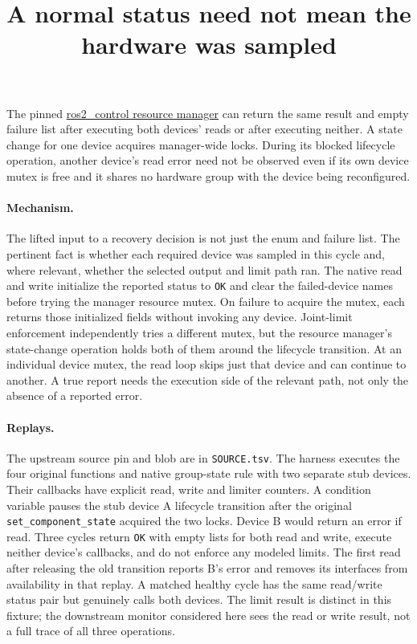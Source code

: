 \documentclass{article}
\title{A normal status need not mean the hardware was sampled}
\begin{document}
\maketitle

The pinned \href{https://github.com/ros-controls/ros2_control/blob/0c94b008a82731967ba89e2e7379ec6d2f07580b/hardware_interface/src/resource_manager.cpp}{ros2\_control resource manager}
can return the same result and empty failure list after executing
both devices' reads or after executing neither. A state change for one
device acquires manager-wide locks. During its blocked lifecycle
operation, another device's read error need not be observed even if
its own device mutex is free and it shares no hardware group with
the device being reconfigured.

\paragraph{Mechanism.}
The lifted input to a recovery decision is not just the enum and
failure list. The pertinent fact is whether each required device
was sampled in this cycle and, where relevant, whether the selected
output and limit path ran. The native read and write initialize the
reported status to \texttt{OK} and clear the failed-device names
before trying the manager resource mutex. On failure to acquire the
mutex, each returns those initialized fields without invoking any
device. Joint-limit enforcement independently tries a different
mutex, but the resource manager's state-change operation holds both
of them around the lifecycle transition. At an individual device
mutex, the read loop skips just that device and can continue to
another. A true report needs the execution side of the relevant
path, not only the absence of a reported error.

\paragraph{Replays.}
The upstream source pin and blob are in \texttt{SOURCE.tsv}. The
harness executes the four original functions and native group-state
rule with two separate stub devices. Their callbacks have explicit
read, write and limiter counters. A condition variable pauses the
stub device A lifecycle transition after the original
\texttt{set\_component\_state} acquired the two locks. Device B
would return an error if read. Three cycles return \texttt{OK} with
empty lists for both read and write, execute neither device's
callbacks, and do not enforce any modeled limits. The first read
after releasing the old transition reports B's error and removes
its interfaces from availability in that replay. A matched
healthy cycle has the same read/write status pair but genuinely
calls both devices. The limit result is distinct in this fixture;
the downstream monitor considered here sees the read or write
result, not a full trace of all three operations.
\end{document}
